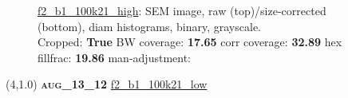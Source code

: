 \begin{figure}[h!]
\label{semimg19}
\caption*{\hyperlink{covtableaug_13_12}{\color{blue} \small \ttfamily f2\_b1\_100k21\_high}: SEM image, raw (top)/size-corrected (bottom), diam histograms, binary, grayscale.\\Cropped: {\bf True} \;\; BW coverage: {\bf 17.65} \:\: corr coverage: {\bf 32.89} \:\: hex fillfrac: {\bf 19.86} \:\: man-adjustment: {\bf \color{blue}{Yes}}}
\end{figure}
\newpage

\begin{textblock}{5}(4,1.0)
{\bf \textsc{aug\_13\_12}}
\hspace{4.5cm}
\hyperlink{covtableaug_13_12}{\color{blue} \large \ttfamily f2\_b1\_100k21\_low}
\end{textblock}

